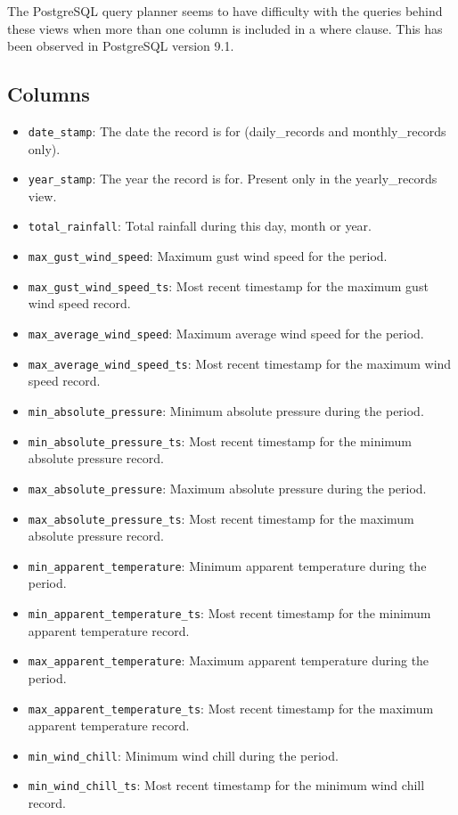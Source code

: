 \documentclass[a4paper,10pt]{book}
\begin{document}
The PostgreSQL query planner seems to have difficulty with the queries behind these views when more than one column is included in a where clause. This has been observed in PostgreSQL version 9.1.

\subsection{Columns}
\begin{itemize}
\item \verb|date_stamp|: The date the record is for (daily\_records and monthly\_records only).
\item \verb|year_stamp|: The year the record is for. Present only in the yearly\_records view.
\item \verb|total_rainfall|: Total rainfall during this day, month or year.
\item \verb|max_gust_wind_speed|: Maximum gust wind speed for the period.
\item \verb|max_gust_wind_speed_ts|: Most recent timestamp for the maximum gust wind speed record.
\item \verb|max_average_wind_speed|: Maximum average wind speed for the period.
\item \verb|max_average_wind_speed_ts|: Most recent timestamp for the maximum wind speed record.
\item \verb|min_absolute_pressure|: Minimum absolute pressure during the period.
\item \verb|min_absolute_pressure_ts|: Most recent timestamp for the minimum absolute pressure record.
\item \verb|max_absolute_pressure|: Maximum absolute pressure during the period.
\item \verb|max_absolute_pressure_ts|: Most recent timestamp for the maximum absolute pressure record.
\item \verb|min_apparent_temperature|: Minimum apparent temperature during the period.
\item \verb|min_apparent_temperature_ts|: Most recent timestamp for the minimum apparent temperature record.
\item \verb|max_apparent_temperature|: Maximum apparent temperature during the period.
\item \verb|max_apparent_temperature_ts|: Most recent timestamp for the maximum apparent temperature record.
\item \verb|min_wind_chill|: Minimum wind chill during the period.
\item \verb|min_wind_chill_ts|: Most recent timestamp for the minimum wind chill record.

\end{itemize}
\end{document}
